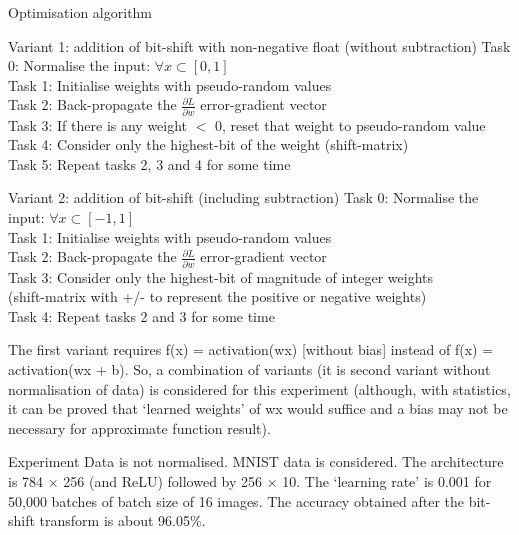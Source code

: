 \documentclass{article}
\begin{document}
	\begin{section}{Optimisation algorithm}
		\begin{subsection}{Variant 1: addition of bit-shift with non-negative float (without subtraction)}
			Task 0: Normalise the input: $ \forall x \subset [0, 1]$ \\ 
			Task 1: Initialise weights with pseudo-random values\\
			Task 2: Back-propagate the $\frac{\partial L}{\partial w}$ error-gradient vector\\
			Task 3: If there is any weight $<$ 0, reset that weight to pseudo-random value\\
			Task 4: Consider only the highest-bit of the weight (shift-matrix)\\
			Task 5: Repeat tasks 2, 3 and 4 for some time\\
		\end{subsection}
		
		\begin{subsection}{Variant 2: addition of bit-shift (including subtraction)}
			Task 0: Normalise the input: $ \forall x \subset [-1, 1]$ \\ 
			Task 1: Initialise weights with pseudo-random values\\
			Task 2: Back-propagate the $\frac{\partial L}{\partial w}$ error-gradient vector\\
			Task 3: Consider only the highest-bit of magnitude of integer weights\\ (shift-matrix with +/- to represent the positive or negative weights)\\
			Task 4: Repeat tasks 2 and 3 for some time\\
		\end{subsection}
	
		The first variant requires f(x) = activation(wx) [without bias] instead of f(x) = activation(wx + b). So, a combination of variants (it is second variant without normalisation of data) is considered for this experiment (although, with statistics, it can be proved that `learned weights' of wx would suffice and a bias may not be necessary for approximate function result).
	\end{section}

	\begin{section}{Experiment}
		Data is not normalised.	MNIST data is considered. The architecture is 784 $\times$ 256 (and ReLU) followed by 256 $\times$ 10. The `learning rate' is 0.001 for 50,000 batches of batch size of 16 images. The accuracy obtained after the bit-shift transform is about 96.05\%.
	\end{section}
\end{document}
